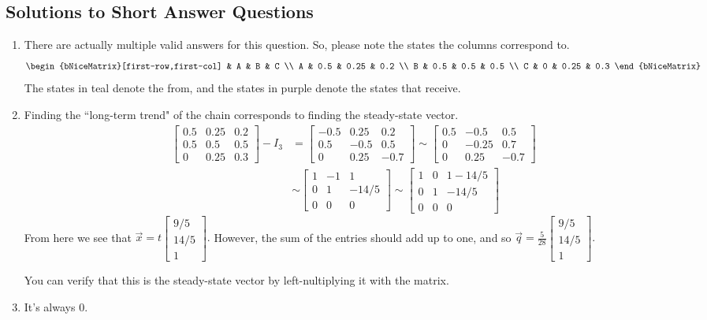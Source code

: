 \subsection{Solutions to Short Answer Questions}
	\begin{enumerate}
		\item There are actually multiple valid answers for this question. So, please note the states the columns correspond to.
			\[
				\begin{bNiceMatrix}[first-row,first-col]
				   	&   A   &   B   &    C   \\
				     A & 0.5  & 0.25 & 0.2 \\
				     B & 0.5  &  0.5  & 0.5 \\
				     C &  0   &  0.25 & 0.3
				\end{bNiceMatrix}
			\]
			The states in teal denote the {\color{teal} from}, and the states in purple denote the states that {\color{purple} receive}.
		\item Finding the ``long-term trend" of the chain corresponds to finding the steady-state vector. 
			\begin{align*}
				\begin{bmatrix}0.5 & 0.25 & 0.2 \\ 0.5 & 0.5 & 0.5 \\ 0 & 0.25 & 0.3\end{bmatrix} - I_3 &= 
				\begin{bmatrix}-0.5 & 0.25 & 0.2 \\ 0.5 & -0.5 & 0.5 \\ 0 & 0.25 & -0.7\end{bmatrix} 
				\sim \begin{bmatrix}0.5 & -0.5 & 0.5 \\ 0 & -0.25 & 0.7 \\ 0 & 0.25 & -0.7\end{bmatrix} \\[0.5em]
				&\sim \begin{bmatrix}1 & -1 & 1 \\ 0 & 1 & - 14/5 \\ 0 & 0 & 0\end{bmatrix} 
				\sim \begin{bmatrix}1 & 0 & 1 - 14/5 \\ 0 & 1 & -14/5 \\ 0 & 0 & 0\end{bmatrix}
			\end{align*}
			From here we see that \(\vec{x} = t\begin{bmatrix}9/5 \\ 14/5 \\ 1\end{bmatrix}.\) However, the sum of the entries should add up to one, and
			so \(\vec{q} = \displaystyle \frac{5}{28}\begin{bmatrix}9/5 \\ 14/5 \\ 1\end{bmatrix}.\)
		
			You can verify that this is the steady-state vector by left-nultiplying it with the matrix.
		
		\item It's always 0.
	\end{enumerate}
